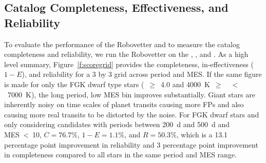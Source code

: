 \subsection{Catalog Completeness, Effectiveness, and Reliability}
\label{s:candr}

To evaluate the performance of the Robovetter and to measure the catalog completeness and reliability, we run the Robovetter on the , , and . As a high level summary, Figure~\ref{f:scoregrid} provides the completeness, in-effectiveness ($1-E$), and reliability for a 3 by 3 grid across period and MES. If the same figure is made for only the FGK dwarf type stars (\logg~$\ge$~4.0 and 4000~K~$\ge$~\tstar~$<$~7000~K), the long period, low MES bin improves substantially. Giant stars are inherently noisy on time scales of planet transits \citep[see Figure~9 of][]{Christiansen2012} causing more FPs and also causing more real transits to be distorted by the noise. For FGK dwarf stars and only considering candidates with periods between 200~d and 500~d and MES~<~10, $C=76.7\%$, $1-E=1.1\%$, and $R=50.3\%$, which is a 13.1 percentage point improvement in reliability and 3 percentage point improvement in completeness compared to all stars in the same period and MES range.


